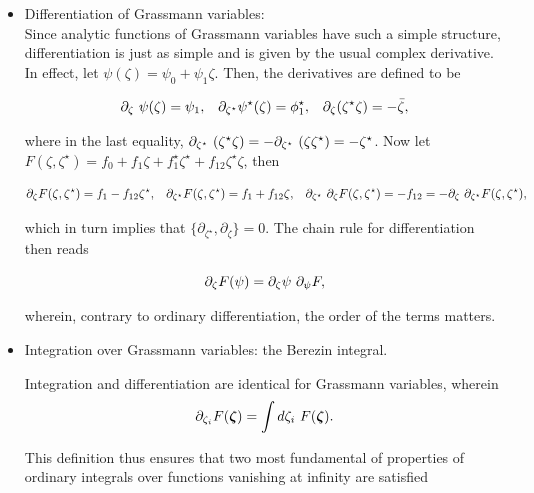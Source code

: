 \begin{itemize}
    \item Differentiation of Grassmann variables: \\
    
    Since analytic functions of Grassmann variables have such a simple structure, differentiation is just as simple and is given by the usual complex derivative. In effect, let $\psi(\zeta) = \psi_0 + \psi_1 \zeta$. Then, the derivatives are defined to be 
    
    \begin{align*}
        \partial_{\zeta} \textnormal{ } \psi(\zeta) &= \psi_1, & \partial_{{\zeta}^\star} {\psi^\star(\zeta)} &= {\phi}^\star_1, & \partial_{\zeta} ({\zeta}^\star \zeta) = - \bar{\zeta},  
    \end{align*}
    
    where in the last equality, $    \partial_{\zeta^\star} \textnormal{ } (\zeta^\star \zeta) = - \partial_{\zeta^\star} \textnormal{ } (\zeta\zeta^\star ) = - \zeta^\star $. Now let $ F(\zeta, {\zeta}^\star) = f_0 + f_1 \zeta + {f}_1^\star {\zeta}^\star + f_{12} {\zeta}^\star \zeta$, then
    
    \begin{align*}
        \partial_{\zeta}  F(\zeta, {\zeta}^\star) &= f_1 - f_{12} {\zeta}^\star, & \partial_{{\zeta}^\star} F(\zeta, {\zeta}^\star) &= f_1 + f_{12} {\zeta}, & \partial_{{\zeta}^\star} \textnormal{ } \partial_{{\zeta}} F(\zeta, {\zeta}^\star) = - f_{12} = - \partial_{\zeta} \textnormal{ } \partial_{{\zeta}^\star}F(\zeta, {\zeta}^\star), 
    \end{align*}
    
    which in turn implies that $\{\partial_{{\zeta}^\star}, \partial_{{\zeta}}\} = 0$. The chain rule for differentiation then reads
    
    $$
        \partial_{{\zeta}} F(\psi) = \partial_{\zeta} \psi \textnormal{ } \partial_{\psi} F,
    $$
    
    wherein, contrary to ordinary differentiation, the order of the terms matters. \\
    
    \item Integration over Grassmann variables: the Berezin integral.
    
    Integration and differentiation are identical for Grassmann variables, wherein 
    $$
        \partial_{\zeta_i} F(\bm{\zeta}) = \int d\zeta_i \textnormal{ } F(\bm{\zeta}) .
    $$
    
    This definition thus ensures that two most fundamental of properties of ordinary integrals over functions vanishing at infinity are satisfied 
    

\end{itemize}
